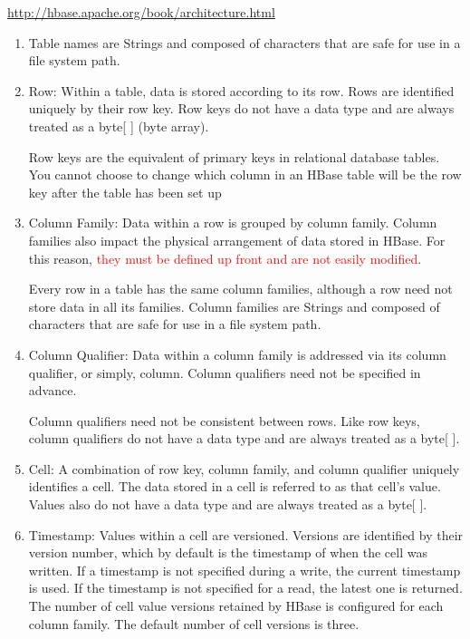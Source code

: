 \url{http://hbase.apache.org/book/architecture.html}

\begin{enumerate}
  \item Table names are Strings and composed
of characters that are safe for use in a file system path.

  \item Row: Within a table, data is stored according to its row. Rows are identified
uniquely by their row key. Row keys do not have a data type and are always
treated as a byte[ ] (byte array).

Row keys are the equivalent of primary keys in relational
database tables. You cannot choose to change which column in an HBase table will
be the row key after the table has been set up

  \item Column Family: Data within a row is grouped by column family. Column
families also impact the physical arrangement of data stored in HBase. For this
reason, \textcolor{red}{they must be defined up front and are not easily
modified}.


Every row in a table has the same column families, although a row need not store
data in all its families. Column families are Strings and composed of characters that are safe
for use in a file system path.


  \item Column Qualifier: Data within a column family is addressed via its column
qualifier, or simply, column. Column qualifiers need not be specified in advance.


Column qualifiers need not be consistent between rows. Like row keys, column
qualifiers do not have a data type and are always treated as a byte[ ].

  \item Cell: A combination of row key, column family, and column qualifier uniquely
identifies a cell. The data stored in a cell is referred to as that cell's value. Values
also do not have a data type and are always treated as a byte[ ].

  \item Timestamp: Values within a cell are versioned. Versions are identified by their
version number, which by default is the timestamp of when the cell was written.
If a timestamp is not specified during a write, the current timestamp is used. If
the timestamp is not specified for a read, the latest one is returned. The number
of cell value versions retained by HBase is configured for each column family.
The default number of cell versions is three. 
\end{enumerate}

